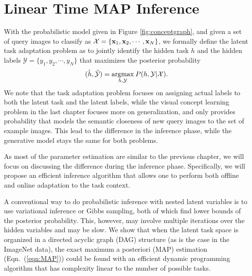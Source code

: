 \section{Linear Time MAP Inference}\label{sec:algo}
With the probabilistic model given in Figure \ref{fig:conceptgraph}, and given a set of query images to classify as $\mathcal{X} = \{\mathbf{x}_1, \mathbf{x}_2, \cdots, \mathbf{x}_N\}$, we formally define the latent task adaptation problem as to jointly identify the hidden task $h$ and the hidden labels $\mathcal{Y} = \{y_1, y_2, \cdots, y_N\}$ that maximizes the posterior probability
\begin{equation}\label{eqn:MAP}
    (\hat{h}, \hat{\mathcal{Y}}) = \underset{h, \mathcal{Y}}{\mathrm{argmax}} \: P(h, \mathcal{Y} | \mathcal{X}).
\end{equation}
We note that the task adaptation problem focuses on assigning actual labels to both the latent task and the latent labels, while the visual concept learning problem in the last chapter focuses more on generalization, and only provides probability that models the semantic closeness of new query images to the set of example images. This lead to the difference in the inference phase, while the generative model stays the same for both problems.

As most of the parameter estimation are similar to the previous chapter, we will focus on discussing the difference during the inference phase. Specifically, we will propose an efficient inference algorithm that allows one to perform both offline and online adaptation to the task context.

A conventional way to do probabilistic inference with nested latent variables is to use variational inference or Gibbs sampling, both of which find lower bounds of the posterior probability. This, however, may involve multiple iterations over the hidden variables and may be slow. We show that when the latent task space is organized in a directed acyclic graph (DAG) structure (as is the case in the ImageNet data), the exact maximum a posteriori (MAP) estimation (Eqn.\ (\ref{eqn:MAP})) could be found with an efficient dynamic programming algorithm that has complexity linear to the number of possible tasks.

